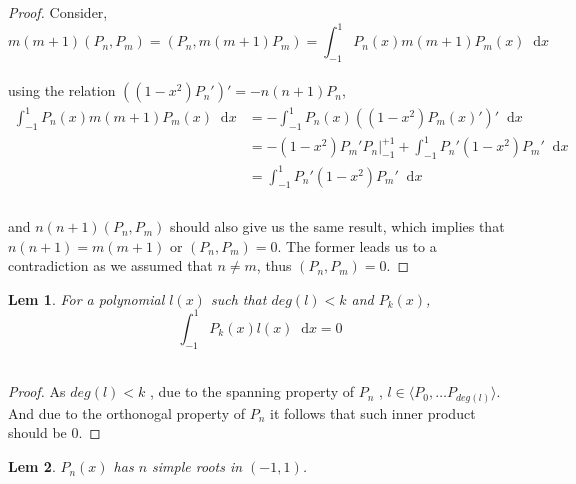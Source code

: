 \documentclass[paper=a4, fontsize=11pt]{scrartcl}
\newcommand*\dif{\mathop{}\!\mathrm{d}}
\newtheorem{lemma}{Lem}
\begin{document}
\begin{proof}
Consider, \\

\begin{equation}\nonumber
	m(m+1) (P_n,P_m) = (P_n,m(m+1)P_m) = \int_{-1}^{1} P_n(x) m (m+1) P_m(x) \dif x
\end{equation}\\

using the relation $((1-x^2)P_n')' = -n(n+1) P_n$, \\

\begin{equation}\nonumber
\begin{split}
\int_{-1}^{1} P_n(x) m (m+1) P_m(x) \dif x &= - \int_{-1}^{1} P_n(x) ((1-x^2)P_m(x)')' \dif x \\[2.5ex]
&= -(1-x^2)P_m ' P_n \bigg|_{-1}^{+1} + \int_{-1}^{1} P_n' (1-x^2) P_m' \dif x\\[2.5ex]
&=  \int_{-1}^{1} P_n' (1-x^2) P_m' \dif x\\
\end{split}
\end{equation}\\

and $n(n+1)(P_n,P_m)$ should also give us the same result, which implies that $n(n+1)=m(m+1)$ or $(P_n,P_m)=0$. The former leads us to a contradiction as we assumed that $n\neq m$, thus $(P_n,P_m)=0$.
\end{proof}
\vspace{0.15in}

\begin{lemma}
	For a polynomial $l(x)$ such that $deg(l) < k$ and $P_k(x)$, \\
	
	\begin{equation}\nonumber
		\int_{-1}^{1} P_k(x) l(x) \dif x = 0
	\end{equation}\\
\end{lemma}

\begin{proof}
As $deg(l)<k$ , due to the spanning property of $P_n$ , $l \in \langle P_0 , \dots P_{deg(l)} \rangle$. And due to the orthonogal property of $P_n$ it follows that such inner product should be 0.
\end{proof}
\vspace{0.15in}

\begin{lemma}
$P_n(x)$ has $n$ simple roots in $(-1,1)$.\\
\end{lemma}
\end{document}
